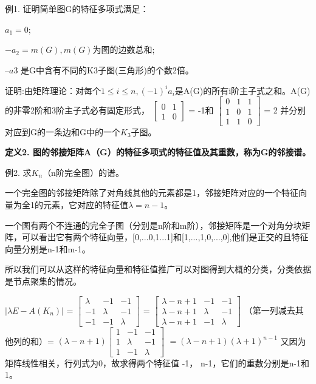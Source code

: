 \documentclass{article}
\begin{document}
例1. 证明简单图G的特征多项式满足：

\quad $a_1 = 0$;

\quad $-a_2 = m(G),m(G)$为图的边数总和;

\quad $–a3$ 是G中含有不同的K3子图(三角形)的个数2倍。

\quad 证明:由矩阵理论：对每个$1 \le i \le n ,(-1)^i a_i $是A(G)的所有i阶主子式之和。A(G)的非零2阶和3阶主子式必有固定形式，
\begin{math}
	\left[
	\begin{smallmatrix}
	0 & 1  \\
	1 & 0 
	\end{smallmatrix}
	\right]
\end{math} = -1和
\begin{math}
	\left[
	\begin{smallmatrix}
	0 & 1 & 1  \\
	1 & 0 & 1 \\
	1 & 1 & 0
	\end{smallmatrix}
	\right]
\end{math} = 2
并分别对应到G的一条边和G中的一个$K_3$子图。

\textbf{定义2. 图的邻接矩阵A（G）的特征多项式的特征值及其重数，称为G的邻接谱。}

例2. 求$K_n$（n阶完全图）的谱。
	
一个完全图的邻接矩阵除了对角线其他的元素都是1，邻接矩阵对应的一个特征向量为全1的元素，它对应的特征值$\lambda = n - 1$。

一个图有两个不连通的完全子图（分别是n阶和m阶），邻接矩阵是一个对角分块矩阵，可以看出它有两个特征向量，[0,...0,1...1]和[1,...,1,0,...,0],他们是正交的且特征向量分别是n-1和m-1。

所以我们可以从这样的特征向量和特征值推广可以对图得到大概的分类，分类依据是节点聚集的情况。

$|\lambda E - A(K_n)| $ = 
\begin{math}
	\left[
	\begin{smallmatrix}
	\lambda & -1 & -1  \\
	-1 & \lambda & -1 \\
	-1 & -1 & \lambda
	\end{smallmatrix}
	\right]
\end{math} = 
\begin{math}
	\left[
	\begin{smallmatrix}
	\lambda-n+1 & -1 & -1  \\
	\lambda-n+1 & \lambda & -1 \\
	\lambda-n+1 & -1 & \lambda
	\end{smallmatrix}
	\right]
\end{math} （第一列减去其他列的和）=
$(\lambda - n + 1)$\begin{math}
	\left[
	\begin{smallmatrix}
	1 & -1 & -1  \\
	1 & \lambda & -1 \\
	1 & -1 & \lambda
	\end{smallmatrix}
	\right]
\end{math} 
$ = (\lambda - n + 1)(\lambda + 1)^{n-1} $
又因为矩阵线性相关，行列式为0，故求得两个特征值 -1， n-1，它们的重数分别是n-1和1。
\end{document}
